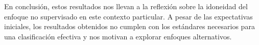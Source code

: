 \documentclass[
10pt, %
a4paper, %
oneside, %
headinclude,footinclude, %
BCOR5mm, %
]{scrartcl}
\begin{document}
En conclusión, estos resultados nos llevan a la reflexión sobre la idoneidad del enfoque no supervisado en este contexto particular. A pesar de las expectativas iniciales, los resultados obtenidos no cumplen con los estándares necesarios para 
una clasificación efectiva y nos motivan a explorar enfoques alternativos.





 











\renewcommand{\refname}{\spacedlowsmallcaps{References}} %




\end{document}
